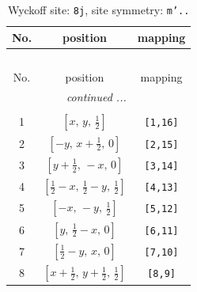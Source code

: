 \documentclass[fleqn,8pt]{jsarticle}
\begin{document}
\begin{longtable}{ccc}
\caption{Wyckoff site: {\tt 8j}, site symmetry: {\tt m'..}}
 \\
 \hline \hline
No. & position & mapping \\ \hline \endfirsthead

\multicolumn{2}{l}{\tablename\ \thetable{}} \\
 \hline \hline
No. & position & mapping \\ \hline \endhead

 \hline \hline
\multicolumn{2}{r}{\footnotesize\it continued ...} \\ \endfoot

 \hline \hline
\multicolumn{2}{r}{} \\ \endlastfoot

1 & $\left[ x,\, y,\, \frac{1}{2} \right]$ & {\tt [1,16]} \\ \hline
2 & $\left[ - y,\, x + \frac{1}{2},\, 0 \right]$ & {\tt [2,15]} \\ \hline
3 & $\left[ y + \frac{1}{2},\, - x,\, 0 \right]$ & {\tt [3,14]} \\ \hline
4 & $\left[ \frac{1}{2} - x,\, \frac{1}{2} - y,\, \frac{1}{2} \right]$ & {\tt [4,13]} \\ \hline
5 & $\left[ - x,\, - y,\, \frac{1}{2} \right]$ & {\tt [5,12]} \\ \hline
6 & $\left[ y,\, \frac{1}{2} - x,\, 0 \right]$ & {\tt [6,11]} \\ \hline
7 & $\left[ \frac{1}{2} - y,\, x,\, 0 \right]$ & {\tt [7,10]} \\ \hline
8 & $\left[ x + \frac{1}{2},\, y + \frac{1}{2},\, \frac{1}{2} \right]$ & {\tt [8,9]} \\
\end{longtable}
\renewcommand{\arraystretch}{1.2}
\end{document}
